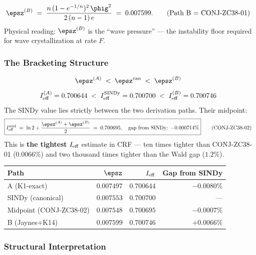 \documentclass[12pt, a4paper]{article}
\begin{document}
\begin{formalbox}[title={Path B: Wave Side via Jaynes + K14 (from ZC38 Section~\ref{sec:main})}]
\[
  \epsz^{(B)} \;=\; \frac{n\,(1-e^{-1/n})^2\,\phig^2}{2\,(n-1)\,e}
  \;=\; 0.007599.
  \tag{Path B = CONJ-ZC38-01}
\]
Physical reading: $\epsz^{(B)}$ is the ``wave pressure'' ---
the instability floor required for wave crystallization at rate $F$.
\end{formalbox}

\subsubsection{The Bracketing Structure}

\begin{keybox}[title={CONJ-ZC38-02 (Gift I-1): The Field-Wave Bracketing Identity}]
\[
  \epsz^{(A)} \;<\; \epsz^{\rm can} \;<\; \epsz^{(B)}
\]
\[
  I_{\rm eff}^{(A)} = 0.700644 \;<\; I_{\rm eff}^{\rm SINDy} = 0.700700
  \;<\; I_{\rm eff}^{(B)} = 0.700746
\]
The SINDy value lies strictly between the two derivation paths.
Their midpoint:
\[
  \boxed{
  I_{\rm eff}^{\rm mid} \;=\; \ln 2 + \frac{\epsz^{(A)} + \epsz^{(B)}}{2}
  \;=\; 0.700695,
  \quad \text{gap from SINDy: } {-0.000714\%}
  }
  \tag{CONJ-ZC38-02}
\]
This is \textbf{the tightest} $I_{\rm eff}$ estimate in CRF ---
ten times tighter than CONJ-ZC38-01 ($0.0066\%$) and
two thousand times tighter than the Wald gap ($1.2\%$).

\medskip
\begin{center}
\renewcommand{\arraystretch}{1.3}
\begin{tabular}{lrrr}
\toprule
Path & $\epsz$ & $I_{\rm eff}$ & Gap from SINDy \\
\midrule
A (K1-exact)         & $0.007497$ & $0.700644$ & $-0.0080\%$ \\
SINDy (canonical)    & $0.007553$ & $0.700700$ & --- \\
Midpoint (CONJ-ZC38-02) & $0.007548$ & $0.700695$ & $-0.0007\%$ \\
B (Jaynes+K14)       & $0.007599$ & $0.700746$ & $+0.0066\%$ \\
\bottomrule
\end{tabular}
\end{center}
\end{keybox}

\subsubsection{Structural Interpretation}
\end{document}
